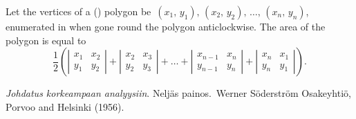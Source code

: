 \documentclass[12pt]{article}
\theoremstyle{definition}
\begin{document}
Let the vertices of a () polygon be\, $(x_1,\,y_1),\,(x_2,\,y_2),\,\ldots,\,(x_n,\,y_n)$,\, enumerated in  when gone round the polygon anticlockwise.  The area of the polygon is equal to
$$
\frac{1}{2}\left(\left|\begin{matrix}x_1&x_2\\y_1&y_2\end{matrix}\right|
+\left|\begin{matrix}x_2&x_3\\y_2&y_3\end{matrix}\right|+\ldots
+\left|\begin{matrix}x_{n-1}&x_n\\y_{n-1}&y_n\end{matrix}\right|+
\left|\begin{matrix}x_n&x_1\\y_n&y_1\end{matrix}\right|\right).
$$
\begin{thebibliography}{9}
 {\em Johdatus korkeampaan analyysiin}. Nelj\"as painos.\, Werner S\"oderstr\"om Osakeyhti\"o, Porvoo and Helsinki (1956).
\end{thebibliography}
\end{document}
